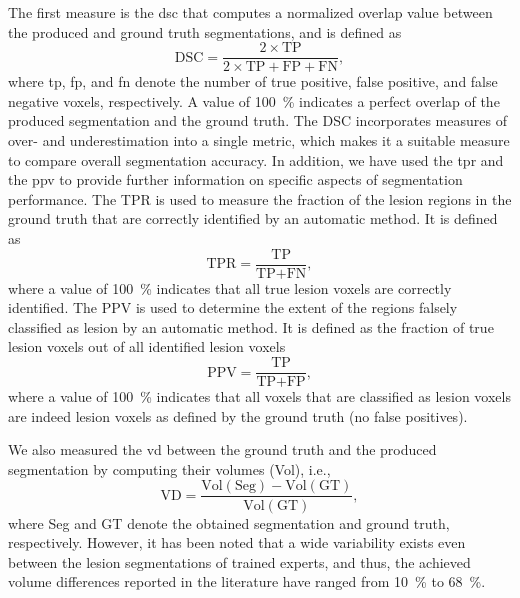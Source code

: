 The first measure is the \gls{dsc}
\citep{dice1945measures} that computes a normalized overlap value between the
produced and ground truth segmentations, and is defined as
\begin{equation}
\text{DSC} = \frac{2 \times \text{TP}}{2 \times \text{TP} + \text{FP} +
\text{FN}},
\end{equation}
%
where \gls{tp}, \gls{fp}, and \gls{fn} denote the number of true positive, false
positive, and false negative voxels, respectively. A value of \SI{100}{\percent}
indicates a perfect overlap of the produced segmentation and the ground truth.
The DSC incorporates measures of over- and underestimation into a single metric,
which makes it a suitable measure to compare overall segmentation accuracy. In
addition, we have used the \gls{tpr} and the \gls{ppv} to provide further
information on specific aspects of segmentation performance. The TPR is used to measure the fraction of the lesion regions in
the ground truth that are correctly identified by an automatic method. It is
defined as
\begin{equation}
\text{TPR} = \frac{\text{TP}}{\text{TP} + \text{FN}},
\end{equation}
where a value of \SI{100}{\percent} indicates that all true lesion voxels are
correctly identified. The PPV is used to determine the extent of
the regions falsely classified as lesion by an automatic method.
It is defined as the fraction of true lesion voxels out of all
identified lesion voxels
\begin{equation}
\text{PPV} = \frac{\text{TP}}{\text{TP} + \text{FP}},
\end{equation}
where a value of \SI{100}{\percent} indicates that all voxels that are
classified as lesion voxels are indeed lesion voxels as defined by the ground
truth (no false positives).

We also measured the \gls{vd} between the ground truth and the produced
segmentation by computing their volumes (Vol), i.e.,
\begin{equation}
\text{VD} = \frac{\text{Vol}(\text{Seg}) - \text{Vol}(\text{GT})}
                {\text{Vol}(\text{GT})},
\end{equation}
where Seg and GT denote the obtained segmentation and ground truth,
respectively. However, it has been noted \citep{garcia2013} that a wide
variability exists even between the lesion segmentations of trained experts, and
thus, the achieved volume differences reported in the literature have ranged
from \SI{10}{\percent} to \SI{68}{\percent}.

